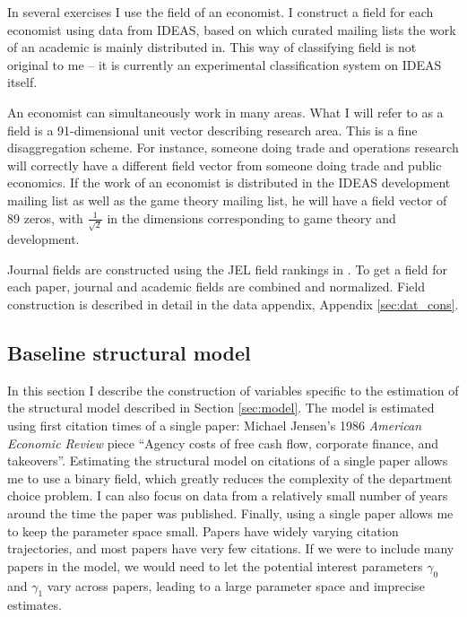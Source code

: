 In several exercises I use the field of an economist. I
construct a field for each economist using data from IDEAS, based on
which curated mailing lists the work of an academic is mainly distributed in. 
This way of classifying field is not original to me -- it is currently
an experimental classification system on IDEAS itself.

An economist can simultaneously work in many areas.  What I will refer to as a 
field is a 91-dimensional unit vector describing research area. This is a 
fine disaggregation scheme.  For instance, someone doing trade and operations research
will correctly have a different field vector from someone doing trade and public economics. 
If the work of an economist is distributed in the IDEAS development 
mailing list as well as the game theory mailing list, he will
have a field vector of 89 zeros, with $\frac{1}{\sqrt{2}}$ in the
dimensions corresponding to game theory and development. 

Journal fields are constructed using the JEL field rankings in \citet{barrett2000subdiscipline}.
To get a field for each paper, journal and academic fields are combined and normalized.
Field construction is described in detail in the data appendix, Appendix \ref{sec:dat_cons}.

\subsection{Baseline structural model}
\label{sec:struct_dat}

In this section I describe the construction of variables specific to the estimation
of the structural model described in Section \ref{sec:model}.  The model is
estimated using first citation
times of a single paper: Michael Jensen's 1986 \emph{American Economic
Review} piece ``Agency costs of free cash
flow, corporate finance, and takeovers''.
Estimating the structural model on
citations of a single paper allows me to use a binary field,
which greatly reduces the complexity of the department choice problem.
I can also focus on data from a relatively small number of years around the time the paper
was published.  Finally, using a single paper allows me to keep the parameter 
space small.  Papers have widely varying citation trajectories, and most
papers have very few citations.  If we were to include many papers in the model,
we would need to let the potential interest parameters  $\gamma_0$ and $\gamma_1$
vary across papers, leading to a large parameter space and imprecise estimates.\footnotemark{}

